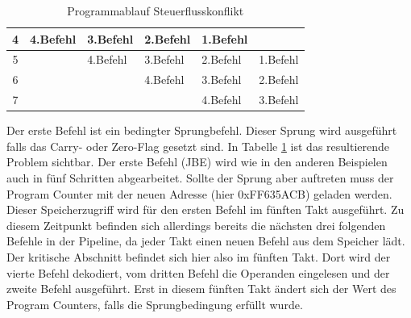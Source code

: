 \documentclass[12pt]{article}
\begin{document}
\begin{table}[]
\begin{tabular}{|c|l|l|l|l|l|}
4             & \cellcolor[HTML]{FFFE65}4.Befehl                                                        & \cellcolor[HTML]{67FD9A}3.Befehl                                                           & \cellcolor[HTML]{38FFF8}2.Befehl                                                            & \cellcolor[HTML]{9698ED}1.Befehl        &                                                                                               \\ \hline
5             & \cellcolor[HTML]{FFFFFF}                                                                & \cellcolor[HTML]{FFFE65}4.Befehl                                                           & \cellcolor[HTML]{67FD9A}3.Befehl                                                            & \cellcolor[HTML]{38FFF8}2.Befehl        & \cellcolor[HTML]{9698ED}1.Befehl                                                              \\ \hline
6             &                                                                                         & \cellcolor[HTML]{FFFFFF}                                                                   & \cellcolor[HTML]{FFFE65}4.Befehl                                                            & \cellcolor[HTML]{67FD9A}3.Befehl        & \cellcolor[HTML]{38FFF8}2.Befehl                                                              \\ \hline
7             &                                                                                         &                                                                                            & \cellcolor[HTML]{FFFFFF}                                                                    & \cellcolor[HTML]{FFFE65}4.Befehl        & \cellcolor[HTML]{67FD9A}3.Befehl                                                              \\ \hline
\end{tabular}
\caption{Programmablauf Steuerflusskonflikt}
\label{tab:Steuerflusskonflikt}

\end{table}

\noindent Der erste Befehl ist ein bedingter Sprungbefehl. Dieser Sprung wird ausgeführt falls das Carry- oder Zero-Flag gesetzt sind. In Tabelle \ref{tab:Steuerflusskonflikt} ist das resultierende Problem sichtbar. Der erste Befehl (JBE) wird wie in den anderen Beispielen auch in fünf Schritten abgearbeitet. Sollte der Sprung aber auftreten muss der Program Counter mit der neuen Adresse (hier 0xFF635ACB) geladen werden. Dieser Speicherzugriff wird für den ersten Befehl im fünften Takt ausgeführt. Zu diesem Zeitpunkt befinden sich allerdings bereits die nächsten drei folgenden Befehle in der Pipeline, da jeder Takt einen neuen Befehl aus dem Speicher lädt. Der kritische Abschnitt befindet sich hier also im fünften Takt. Dort wird der vierte Befehl dekodiert, vom dritten Befehl die Operanden eingelesen und der zweite Befehl ausgeführt. Erst in diesem fünften Takt ändert sich der Wert des Program Counters, falls die Sprungbedingung erfüllt wurde. 
\end{document}
